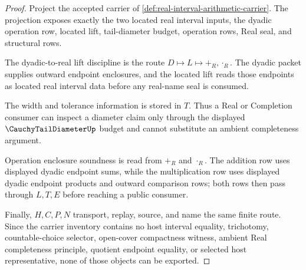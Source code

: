 \begin{proof}
Project the accepted carrier of \autoref{def:real-interval-arithmetic-carrier}. The projection exposes exactly the two located real interval inputs, the dyadic operation row, located lift, tail-diameter budget, operation rows, Real seal, and structural rows.

The dyadic-to-real lift discipline is the route $D\longmapsto L\longmapsto +_R,\cdot_R$. The dyadic packet supplies outward endpoint enclosures, and the located lift reads those endpoints as located real interval data before any real-name seal is consumed.

The width and tolerance information is stored in $T$. Thus a Real or Completion consumer can inspect a diameter claim only through the displayed $\CauchyTailDiameterUp$ budget and cannot substitute an ambient completeness argument.

Operation enclosure soundness is read from $+_R$ and $\cdot_R$. The addition row uses displayed dyadic endpoint sums, while the multiplication row uses displayed dyadic endpoint products and outward comparison rows; both rows then pass through $L,T,E$ before reaching a public consumer.

Finally, $H,C,P,N$ transport, replay, source, and name the same finite route. Since the carrier inventory contains no host interval equality, trichotomy, countable-choice selector, open-cover compactness witness, ambient Real completeness principle, quotient endpoint equality, or selected host representative, none of those objects can be exported.
\end{proof}


